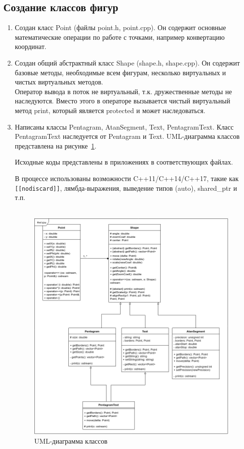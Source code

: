 \documentclass[a4paper, 14pt]{extarticle}
\begin{document}
\subsection{Создание классов фигур}
\begin{enumerate}
    \item Создан класс Point (файлы point.h, point.cpp). Он содержит основные математические операции по работе с точками, например конвертацию координат.
    \item Создан общий абстрактный класс Shape (shape.h, shape.cpp). Он содержит базовые методы, необходимые всем фигурам, несколько виртуальных и чистых виртуальных методов.\\
        Оператор вывода в поток не виртуальный, т.к. дружественные методы не наследуются. Вместо этого в операторе вызывается чистый виртуальный метод print, который является protected и может наследоваться.~\cite{idioms}
    \item Написаны классы Pentagram, AtanSegment, Text, PentagramText. Класс PentagramText наследуется от Pentagram и Text. UML-диаграмма классов представлена на рисунке~\ref{img:uml:shapes}.

    Исходные коды представлены в приложениях в соответствующих файлах.

    В процессе использованы возможности C++11/C++14/C++17, такие как \texttt{[[nodiscard]]}, лямбда-выражения, выведение типов (auto), shared\_ptr и т.п.\\
~\cite{cppwiki}~\cite{moderncpp}~\cite{stroustrup}
    \begin{figure}[h]
        \centering
        \includegraphics[width=\textwidth]{./img/classes_uml.png}
        \caption{UML-диаграмма классов}%
        \label{img:uml:shapes}
    \end{figure}
\end{enumerate}
\end{document}

